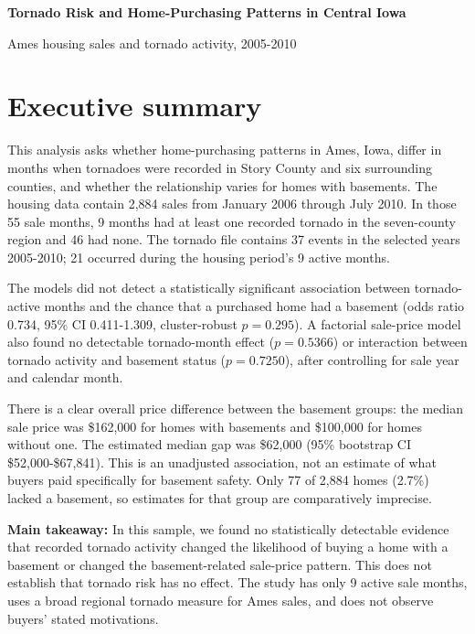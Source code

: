 ﻿\documentclass[11pt]{article}
\begin{document}
{\Large\bfseries Tornado Risk and Home-Purchasing Patterns in Central Iowa}\par
{\large Ames housing sales and tornado activity, 2005-2010}\par
\vspace{3pt}
\vspace{10pt}

\section*{Executive summary}
This analysis asks whether home-purchasing patterns in Ames, Iowa, differ in months when tornadoes were recorded in Story County and six surrounding counties, and whether the relationship varies for homes with basements. The housing data contain 2,884 sales from January 2006 through July 2010. In those 55 sale months, 9 months had at least one recorded tornado in the seven-county region and 46 had none. The tornado file contains 37 events in the selected years 2005-2010; 21 occurred during the housing period's 9 active months.

The models did not detect a statistically significant association between tornado-active months and the chance that a purchased home had a basement (odds ratio 0.734, 95\% CI 0.411-1.309, cluster-robust $p=0.295$). A factorial sale-price model also found no detectable tornado-month effect ($p=0.5366$) or interaction between tornado activity and basement status ($p=0.7250$), after controlling for sale year and calendar month.

There is a clear overall price difference between the basement groups: the median sale price was \$162,000 for homes with basements and \$100,000 for homes without one. The estimated median gap was \$62,000 (95\% bootstrap CI \$52,000-\$67,841). This is an unadjusted association, not an estimate of what buyers paid specifically for basement safety. Only 77 of 2,884 homes (2.7\%) lacked a basement, so estimates for that group are comparatively imprecise.

\textbf{Main takeaway:} In this sample, we found no statistically detectable evidence that recorded tornado activity changed the likelihood of buying a home with a basement or changed the basement-related sale-price pattern. This does not establish that tornado risk has no effect. The study has only 9 active sale months, uses a broad regional tornado measure for Ames sales, and does not observe buyers' stated motivations.
\end{document}
